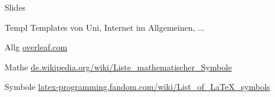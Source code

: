\begin{frame}
\hspace{2em}
\begin{minipage}{.9\textwidth}
\begin{itemize}[<+->]
	\item[Slides] \url{}
	\item[Templ] Templates von Uni, Internet im Allgemeinen, ...
	\item[Allg] \url{overleaf.com}
	\item[Mathe] \url{de.wikipedia.org/wiki/Liste_mathematischer_Symbole}
	\item[Symbole] \url{latex-programming.fandom.com/wiki/List_of_LaTeX_symbols}
\end{itemize}
\end{minipage}
\end{frame}

